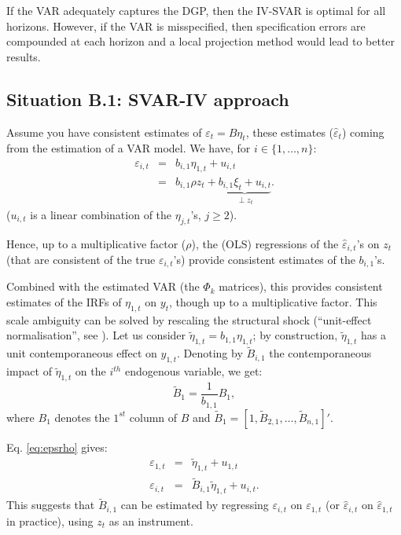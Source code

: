 \documentclass[
  12pt,
]{book}
\theoremstyle{definition}
\theoremstyle{definition}
\theoremstyle{definition}
\theoremstyle{definition}
\theoremstyle{remark}
\begin{document}
If the VAR adequately captures the DGP, then the IV-SVAR is optimal for all horizons. However, if the VAR is misspecified, then specification errors are compounded at each horizon and a local projection method would lead to better results.

\subsection{Situation B.1: SVAR-IV approach}\label{SVARIVa}

Assume you have consistent estimates of \(\varepsilon_t = B\eta_t\), these estimates (\(\hat\varepsilon_{t}\)) coming from the estimation of a VAR model. We have, for \(i \in \{1,\dots,n\}\):
\begin{eqnarray}
\varepsilon_{i,t} &=& b_{i,1} \eta_{1,t} + u_{i,t} \label{eq:epsrho}\\
&=& b_{i,1} \rho z_t + \underbrace{b_{i,1}\xi_t + u_{i,t}}_{\perp z_t}. \nonumber
\end{eqnarray}
(\(u_{i,t}\) is a linear combination of the \(\eta_{j,t}\)'s, \(j\ge2\)).

Hence, up to a multiplicative factor (\(\rho\)), the (OLS) regressions of the \(\hat\varepsilon_{i,t}\)'s on \(z_t\) (that are consistent of the true \(\varepsilon_{i,t}\)'s) provide consistent estimates of the \(b_{i,1}\)'s.

Combined with the estimated VAR (the \(\Phi_k\) matrices), this provides consistent estimates of the IRFs of \(\eta_{1,t}\) on \(y_t\), though up to a multiplicative factor. This scale ambiguity can be solved by rescaling the structural shock (``unit-effect normalisation'', see \citet{Stock_Watson_2018}). Let us consider \(\tilde\eta_{1,t}=b_{1,1}\eta_{1,t}\); by construction, \(\tilde\eta_{1,t}\) has a unit contemporaneous effect on \(y_{1,t}\). Denoting by \(\tilde{B}_{i,1}\) the contemporaneous impact of \(\tilde\eta_{1,t}\) on the \(i^{th}\) endogenous variable, we get:
\[
\tilde{B}_{1} = \frac{1}{b_{1,1}} {B}_{1},
\]
where \(B_{1}\) denotes the \(1^{st}\) column of \(B\) and \(\tilde{B}_{1}=[1,\tilde{B}_{2,1},\dots,\tilde{B}_{n,1}]'\).

Eq. \eqref{eq:epsrho} gives:
\begin{eqnarray*}
\varepsilon_{1,t} &=& \tilde\eta_{1,t} + u_{1,t}\\
\varepsilon_{i,t} &=& \tilde{B}_{i,1} \tilde\eta_{1,t} + u_{i,t}.
\end{eqnarray*}
This suggests that \(\tilde{B}_{i,1}\) can be estimated by regressing \(\varepsilon_{i,t}\) on \(\varepsilon_{1,t}\) (or \(\hat\varepsilon_{i,t}\) on \(\hat\varepsilon_{1,t}\) in practice), using \(z_t\) as an instrument.
\end{document}
